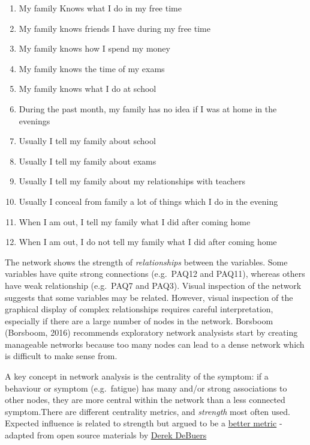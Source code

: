 \documentclass[]{book}
\providecommand{\tightlist}{%
  \setlength{\itemsep}{0pt}\setlength{\parskip}{0pt}}
\begin{document}
\begin{enumerate}
\def\labelenumi{\arabic{enumi}.}
\tightlist
\item
  My family Knows what I do in my free time
\item
  My family knows friends I have during my free time
\item
  My family knows how I spend my money
\item
  My family knows the time of my exams
\item
  My family knows what I do at school
\item
  During the past month, my family has no idea if I was at home in the evenings
\item
  Usually I tell my family about school
\item
  Usually I tell my family about exams
\item
  Usually I tell my family about my relationships with teachers
\item
  Usually I conceal from family a lot of things which I do in the evening
\item
  When I am out, I tell my family what I did after coming home
\item
  When I am out, I do not tell my family what I did after coming home
\end{enumerate}

The network shows the strength of \emph{relationships} between the variables. Some variables have quite strong connections (e.g.~PAQ12 and PAQ11), whereas others have weak relationship (e.g.~PAQ7 and PAQ3). Visual inspection of the network suggests that some variables may be related. However, visual inspection of the graphical display of complex relationships requires careful interpretation, especially if there are a large number of nodes in the network. Borsboom (Borsboom, 2016) recommends exploratory network analysists start by creating manageable networks because too many nodes can lead to a dense network which is difficult to make sense from.

A key concept in network analysis is the centrality of the symptom: if a behaviour or symptom (e.g.~fatigue) has many and/or strong associations to other nodes, they are more central within the network than a less connected symptom.There are different centrality metrics, and \emph{strength} most often used. Expected influence is related to strength but argued to be a \href{https://psych-networks.com/expected-influence-new-centrality-metric-robinaugh-et-al-2016/}{better metric} - adapted from open source materials by \href{https://derekdebeurs.github.io/esssb17/}{Derek DeBuers}
\end{document}
